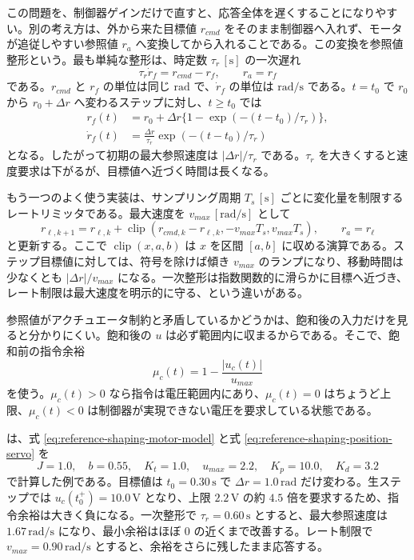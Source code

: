 この問題を、制御器ゲインだけで直すと、応答全体を遅くすることになりやすい。別の考え方は、外から来た目標値 $r_{cmd}$ をそのまま制御器へ入れず、モータが追従しやすい参照値 $r_a$ へ変換してから入れることである。この変換を参照値整形という。最も単純な整形は、時定数 $\tau_r\,[\mathrm{s}]$ の一次遅れ
\begin{equation}
  \tau_r\dot{r}_f=r_{cmd}-r_f,
  \qquad r_a=r_f
  \label{eq:first-order-reference-shaping}
\end{equation}
である。$r_{cmd}$ と $r_f$ の単位は同じ $\mathrm{rad}$ で、$\dot{r}_f$ の単位は $\mathrm{rad/s}$ である。$t=t_0$ で $r_0$ から $r_0+\Delta r$ へ変わるステップに対し、$t\geq t_0$ では
\begin{align}
  r_f(t)&=r_0+\Delta r\{1-\exp(-(t-t_0)/\tau_r)\},\\
  \dot{r}_f(t)&=\frac{\Delta r}{\tau_r}
  \exp(-(t-t_0)/\tau_r)
  \label{eq:first-order-reference-step}
\end{align}
となる。したがって初期の最大参照速度は $|\Delta r|/\tau_r$ である。$\tau_r$ を大きくすると速度要求は下がるが、目標値へ近づく時間は長くなる。

もう一つのよく使う実装は、サンプリング周期 $T_s\,[\mathrm{s}]$ ごとに変化量を制限するレートリミッタである。最大速度を $v_{max}\,[\mathrm{rad/s}]$ として
\begin{equation}
  r_{\ell,k+1}
  =
  r_{\ell,k}
  +
  \operatorname{clip}
  \left(
    r_{cmd,k}-r_{\ell,k},
    -v_{max}T_s,
    v_{max}T_s
  \right),
  \qquad r_a=r_\ell
  \label{eq:rate-limited-reference}
\end{equation}
と更新する。ここで $\operatorname{clip}(x,a,b)$ は $x$ を区間 $[a,b]$ に収める演算である。ステップ目標値に対しては、符号を除けば傾き $v_{max}$ のランプになり、移動時間は少なくとも $|\Delta r|/v_{max}$ になる。一次整形は指数関数的に滑らかに目標へ近づき、レート制限は最大速度を明示的に守る、という違いがある。

参照値がアクチュエータ制約と矛盾しているかどうかは、飽和後の入力だけを見ると分かりにくい。飽和後の $u$ は必ず範囲内に収まるからである。そこで、飽和前の指令余裕
\begin{equation}
  \mu_c(t)=1-\frac{|u_c(t)|}{u_{max}}
  \label{eq:command-margin-reference-shaping}
\end{equation}
を使う。$\mu_c(t)>0$ なら指令は電圧範囲内にあり、$\mu_c(t)=0$ はちょうど上限、$\mu_c(t)<0$ は制御器が実現できない電圧を要求している状態である。

 は、式 \eqref{eq:reference-shaping-motor-model} と式 \eqref{eq:reference-shaping-position-servo} を
\begin{equation}
  J=1.0,\quad b=0.55,\quad K_t=1.0,\quad
  u_{max}=2.2,\quad K_p=10.0,\quad K_d=3.2
\end{equation}
で計算した例である。目標値は $t_0=0.30\,\mathrm{s}$ で $\Delta r=1.0\,\mathrm{rad}$ だけ変わる。生ステップでは $u_c(t_0^+)=10.0\,\mathrm{V}$ となり、上限 $2.2\,\mathrm{V}$ の約 $4.5$ 倍を要求するため、指令余裕は大きく負になる。一次整形で $\tau_r=0.60\,\mathrm{s}$ とすると、最大参照速度は $1.67\,\mathrm{rad/s}$ になり、最小余裕はほぼ $0$ の近くまで改善する。レート制限で $v_{max}=0.90\,\mathrm{rad/s}$ とすると、余裕をさらに残したまま応答する。

